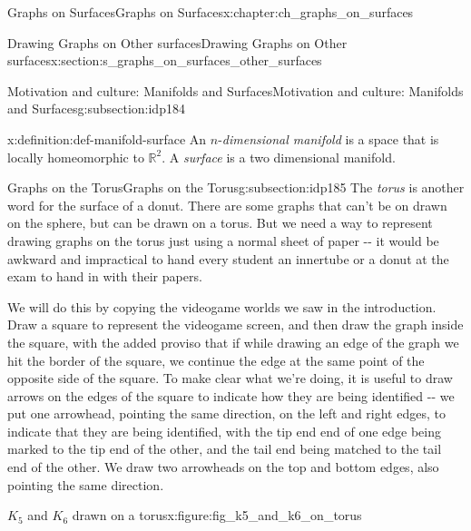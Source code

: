 \documentclass[oneside,10pt,]{book}
\numberwithin{equation}{section}
\newcommand{\reals}{\mathbb{R}}
\begin{document}
\begin{chapterptx}{Graphs on Surfaces}{}{Graphs on Surfaces}{}{}{x:chapter:ch_graphs_on_surfaces}
\begin{sectionptx}{Drawing Graphs on Other surfaces}{}{Drawing Graphs on Other surfaces}{}{}{x:section:s_graphs_on_surfaces_other_surfaces}
\begin{subsectionptx}{Motivation and culture: Manifolds and Surfaces}{}{Motivation and culture: Manifolds and Surfaces}{}{}{g:subsection:idp184}
\begin{definition}{}{x:definition:def-manifold-surface}
An \(n\)-\emph{dimensional manifold} is a space that is locally homeomorphic to \(\reals^2\).  A \emph{surface} is a two dimensional manifold.%
\end{definition}
\end{subsectionptx}
%
%
\typeout{************************************************}
\typeout{************************************************}
%
\begin{subsectionptx}{Graphs on the Torus}{}{Graphs on the Torus}{}{}{g:subsection:idp185}
The \emph{torus} is another word for the surface of a donut.  There are some graphs that can't be on drawn on the sphere, but can be drawn on a torus.  But we need a way to represent drawing graphs on the torus just using a normal sheet of paper -{}-{} it would be awkward and impractical to hand every student an innertube or a donut at the exam to hand in with their papers.%
\par
We will do this by copying the videogame worlds we saw in the introduction.  Draw a square to represent the videogame screen, and then draw the graph inside the square, with the added proviso that if while drawing an edge of the graph we hit the border of the square, we continue the edge at the same point of the opposite side of the square.  To make clear what we're doing, it is useful to draw arrows on the edges of the square to indicate how they are being identified -{}-{} we put one arrowhead, pointing the same direction, on the left and right edges, to indicate that they are being identified, with the tip end end of one edge being marked to the tip end of the other, and the tail end being matched to the tail end of the other.  We draw two arrowheads on the top and bottom edges, also pointing the same direction.%
\begin{figureptx}{\(K_5\) and \(K_6\)  drawn on a torus}{x:figure:fig_k5_and_k6_on_torus}{}%
\begin{image}{0}{1}{0}%
\end{image}
\end{figureptx}
\end{subsectionptx}
\end{sectionptx}
\end{chapterptx}
\end{document}
